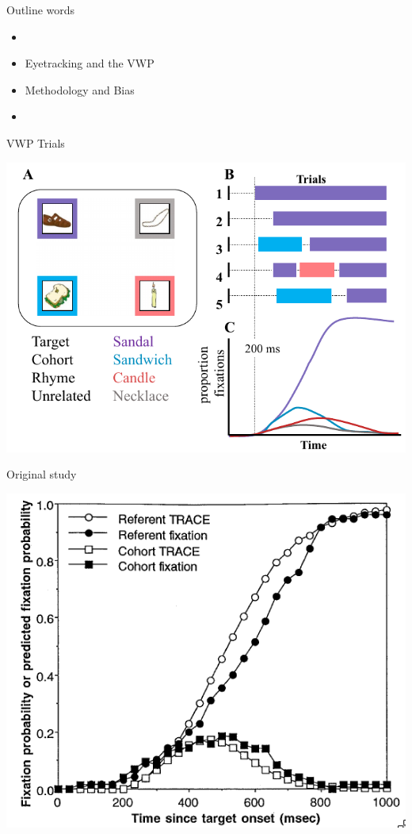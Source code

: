 \documentclass{beamer}
\begin{document}
\begin{frame}{Outline}\Large
words 

\begin{itemize}
	\item 
	\item Eyetracking and the VWP
	\item Methodology and Bias
	\item
\end{itemize}

\end{frame}




\begin{frame}{VWP Trials}
\begin{center}
\includegraphics[scale=0.4]{img/bob_vwp_full.png}
\end{center}
\end{frame}

\begin{frame}{Original study}
\begin{center}
\includegraphics[scale=0.45]{img/allopenna_trace_compare.png}
\end{center}
\end{frame}
\end{document}
